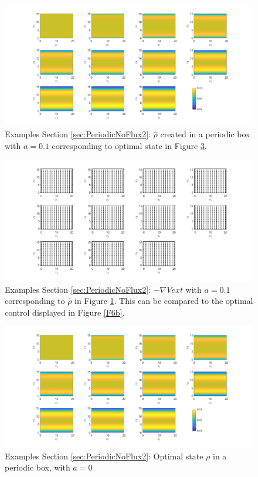 \documentclass[11pt, a4paper]{article}
\theoremstyle{definition}
\newcommand{\hr}{\widehat \rho}
\begin{document}
\begin{figure}[h]
	\centering
	\includegraphics[scale=0.35]{rhoHatPeri6.png}
	\caption{Examples Section \ref{sec:PeriodicNoFlux2}: $\hr$ created in a periodic box with $a = 0.1$ corresponding to optimal state in Figure \ref{F6a}.} 
	\label{F6}
\end{figure}
\begin{figure}[h]
	\centering
	\includegraphics[scale=0.35]{GradVext6.png}
	\caption{Examples Section \ref{sec:PeriodicNoFlux2}: $-\nabla Vext$ with $a = 0.1$ corresponding to $\hr$ in Figure \ref{F6}. This can be compared to the optimal control displayed in Figure \ref{F6b}.} 
	\label{F6V}
\end{figure}
\begin{figure}[h]
	\centering
	\includegraphics[scale=0.35]{rhoOptPeri6.png}
	\caption{Examples Section \ref{sec:PeriodicNoFlux2}: Optimal state $\rho$ in a periodic box, with $a = 0$} 
	\label{F6a}
\end{figure}
\end{document}
